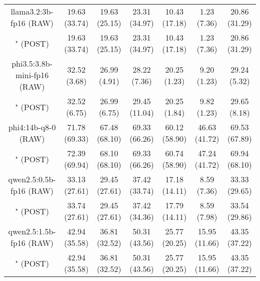 \begin{table}[]
{\begin{tabular}{ccccccc}
      \multicolumn{1}{c|}{llama3.2:3b-fp16 (RAW)} & 19.63 (33.74) & 19.63 (25.15) & \multicolumn{1}{c|}{23.31 (34.97)} & 10.43 (17.18) & \multicolumn{1}{c|}{1.23 (7.36)} & 20.86 (31.29) \\

      \multicolumn{1}{c|}{" (POST)} & 19.63 (33.74) & 19.63 (25.15) & \multicolumn{1}{c|}{23.31 (34.97)} & 10.43 (17.18) & \multicolumn{1}{c|}{1.23 (7.36)} & 20.86 (31.29) \\
      \cline{1-7}

      \multicolumn{1}{c|}{phi3.5:3.8b-mini-fp16 (RAW)} & 32.52 (3.68) & 26.99 (4.91) & \multicolumn{1}{c|}{28.22 (7.36)} & 20.25 (1.23) & \multicolumn{1}{c|}{9.20 (1.23)} & 29.24 (5.32) \\

      \multicolumn{1}{c|}{" (POST)} & 32.52 (6.75) & 26.99 (6.75) & \multicolumn{1}{c|}{29.45 (11.04)} & 20.25 (1.84) & \multicolumn{1}{c|}{9.82 (1.23)} & 29.65 (8.18) \\
      \cline{1-7}

      \multicolumn{1}{c|}{phi4:14b-q8-0 (RAW)} & 71.78 (69.33) & 67.48 (68.10) & \multicolumn{1}{c|}{69.33 (66.26)} & 60.12 (58.90) & \multicolumn{1}{c|}{46.63 (41.72)} & 69.53 (67.89) \\

      \multicolumn{1}{c|}{" (POST)} & 72.39 (69.94) & 68.10 (68.10) & \multicolumn{1}{c|}{69.33 (66.26)} & 60.74 (58.90) & \multicolumn{1}{c|}{47.24 (41.72)} & 69.94 (68.10) \\
      \cline{1-7}

      \multicolumn{1}{c|}{qwen2.5:0.5b-fp16 (RAW)} & 33.13 (27.61) & 29.45 (27.61) & \multicolumn{1}{c|}{37.42 (33.74)} & 17.18 (14.11) & \multicolumn{1}{c|}{8.59 (7.36)} & 33.33 (29.65) \\

      \multicolumn{1}{c|}{" (POST)} & 33.74 (27.61) & 29.45 (27.61) & \multicolumn{1}{c|}{37.42 (34.36)} & 17.79 (14.11) & \multicolumn{1}{c|}{8.59 (7.98)} & 33.54 (29.86) \\
      \cline{1-7}

      \multicolumn{1}{c|}{qwen2.5:1.5b-fp16 (RAW)} & 42.94 (35.58) & 36.81 (32.52) & \multicolumn{1}{c|}{50.31 (43.56)} & 25.77 (20.25) & \multicolumn{1}{c|}{15.95 (11.66)} & 43.35 (37.22) \\

      \multicolumn{1}{c|}{" (POST)} & 42.94 (35.58) & 36.81 (32.52) & \multicolumn{1}{c|}{50.31 (43.56)} & 25.77 (20.25) & \multicolumn{1}{c|}{15.95 (11.66)} & 43.35 (37.22) \\
      \cline{1-7}


\end{tabular}}
\end{table}
